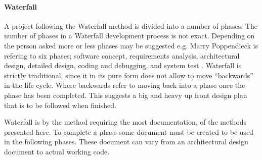 \paragraph{Waterfall}
A project following the Waterfall method is divided into a number of phases.
The number of phases in a Waterfall development process is not exact.
Depending on the person asked more or less phases may be suggested e.g. Marry Poppendieck is refering to six phases; software concept, requirements analysis, architectural design, detailed design, coding and debugging, and system test \cite{Poppendieck00}.
Waterfall is strictly traditional, since it in its pure form does not allow to move ``backwards'' in the life cycle.
Where backwards refer to moving back into a phase once the phase has been completed.
This suggests a big and heavy up front design plan that is to be followed when finished.

Waterfall is by the method requiring the most documentation, of the methods presented here.
To complete a phase some document must be created to be used in the following phases.
These document can vary from an architectural design document to actual working code.

